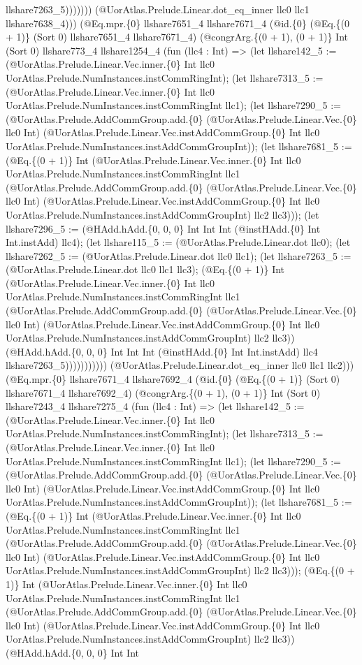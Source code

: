 \documentclass[11pt]{article}
\begin{document}
llshare7263\_5))))))) (@UorAtlas.Prelude.Linear.dot\_eq\_inner llc0 llc1 llshare7638\_4))) (@Eq.mpr.\{0\} llshare7651\_4 llshare7671\_4 (@id.\{0\} (@Eq.\{(0 + 1)\} (Sort 0) llshare7651\_4 llshare7671\_4) (@congrArg.\{(0 + 1), (0 + 1)\} Int (Sort 0) llshare773\_4 llshare1254\_4 (fun (llc4 : Int) => (let llshare142\_5 := (@UorAtlas.Prelude.Linear.Vec.inner.\{0\} Int llc0 UorAtlas.Prelude.NumInstances.instCommRingInt); (let llshare7313\_5 := (@UorAtlas.Prelude.Linear.Vec.inner.\{0\} Int llc0 UorAtlas.Prelude.NumInstances.instCommRingInt llc1); (let llshare7290\_5 := (@UorAtlas.Prelude.AddCommGroup.add.\{0\} (@UorAtlas.Prelude.Linear.Vec.\{0\} llc0 Int) (@UorAtlas.Prelude.Linear.Vec.instAddCommGroup.\{0\} Int llc0 UorAtlas.Prelude.NumInstances.instAddCommGroupInt)); (let llshare7681\_5 := (@Eq.\{(0 + 1)\} Int (@UorAtlas.Prelude.Linear.Vec.inner.\{0\} Int llc0 UorAtlas.Prelude.NumInstances.instCommRingInt llc1 (@UorAtlas.Prelude.AddCommGroup.add.\{0\} (@UorAtlas.Prelude.Linear.Vec.\{0\} llc0 Int) (@UorAtlas.Prelude.Linear.Vec.instAddCommGroup.\{0\} Int llc0 UorAtlas.Prelude.NumInstances.instAddCommGroupInt) llc2 llc3))); (let llshare7296\_5 := (@HAdd.hAdd.\{0, 0, 0\} Int Int Int (@instHAdd.\{0\} Int Int.instAdd) llc4); (let llshare115\_5 := (@UorAtlas.Prelude.Linear.dot llc0); (let llshare7262\_5 := (@UorAtlas.Prelude.Linear.dot llc0 llc1); (let llshare7263\_5 := (@UorAtlas.Prelude.Linear.dot llc0 llc1 llc3); (@Eq.\{(0 + 1)\} Int (@UorAtlas.Prelude.Linear.Vec.inner.\{0\} Int llc0 UorAtlas.Prelude.NumInstances.instCommRingInt llc1 (@UorAtlas.Prelude.AddCommGroup.add.\{0\} (@UorAtlas.Prelude.Linear.Vec.\{0\} llc0 Int) (@UorAtlas.Prelude.Linear.Vec.instAddCommGroup.\{0\} Int llc0 UorAtlas.Prelude.NumInstances.instAddCommGroupInt) llc2 llc3)) (@HAdd.hAdd.\{0, 0, 0\} Int Int Int (@instHAdd.\{0\} Int Int.instAdd) llc4 llshare7263\_5))))))))))) (@UorAtlas.Prelude.Linear.dot\_eq\_inner llc0 llc1 llc2))) (@Eq.mpr.\{0\} llshare7671\_4 llshare7692\_4 (@id.\{0\} (@Eq.\{(0 + 1)\} (Sort 0) llshare7671\_4 llshare7692\_4) (@congrArg.\{(0 + 1), (0 + 1)\} Int (Sort 0) llshare7243\_4 llshare7275\_4 (fun (llc4 : Int) => (let llshare142\_5 := (@UorAtlas.Prelude.Linear.Vec.inner.\{0\} Int llc0 UorAtlas.Prelude.NumInstances.instCommRingInt); (let llshare7313\_5 := (@UorAtlas.Prelude.Linear.Vec.inner.\{0\} Int llc0 UorAtlas.Prelude.NumInstances.instCommRingInt llc1); (let llshare7290\_5 := (@UorAtlas.Prelude.AddCommGroup.add.\{0\} (@UorAtlas.Prelude.Linear.Vec.\{0\} llc0 Int) (@UorAtlas.Prelude.Linear.Vec.instAddCommGroup.\{0\} Int llc0 UorAtlas.Prelude.NumInstances.instAddCommGroupInt)); (let llshare7681\_5 := (@Eq.\{(0 + 1)\} Int (@UorAtlas.Prelude.Linear.Vec.inner.\{0\} Int llc0 UorAtlas.Prelude.NumInstances.instCommRingInt llc1 (@UorAtlas.Prelude.AddCommGroup.add.\{0\} (@UorAtlas.Prelude.Linear.Vec.\{0\} llc0 Int) (@UorAtlas.Prelude.Linear.Vec.instAddCommGroup.\{0\} Int llc0 UorAtlas.Prelude.NumInstances.instAddCommGroupInt) llc2 llc3))); (@Eq.\{(0 + 1)\} Int (@UorAtlas.Prelude.Linear.Vec.inner.\{0\} Int llc0 UorAtlas.Prelude.NumInstances.instCommRingInt llc1 (@UorAtlas.Prelude.AddCommGroup.add.\{0\} (@UorAtlas.Prelude.Linear.Vec.\{0\} llc0 Int) (@UorAtlas.Prelude.Linear.Vec.instAddCommGroup.\{0\} Int llc0 UorAtlas.Prelude.NumInstances.instAddCommGroupInt) llc2 llc3)) (@HAdd.hAdd.\{0, 0, 0\} Int Int 
\end{document}
